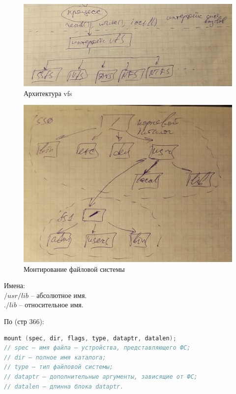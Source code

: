 \begin{figure}[H]
  \centering
  \includegraphics[width=\textwidth]{pic/1.png}
  \caption{Архитектура vfs}
\end{figure}

\begin{figure}[h!]
  \centering
  \includegraphics[width=\textwidth]{pic/2.png}
  \caption{Монтирование файловой системы}
\end{figure}

Имена:\\
$/usr/lib$ – абсолютное имя.\\
$./lib$ – относительное имя.

По \cite{UNIX_Internals} (стр 366):
\begin{lstlisting}[language=c]
mount (spec, dir, flags, type, dataptr, datalen);
// spec – имя файла – устройства, представляющего ФС;
// dir – полное имя каталога;
// type – тип файловой системы;
// dataptr – дополнительные аргументы, зависящие от ФС;
// datalen – длинна блока dataptr.
\end{lstlisting}

